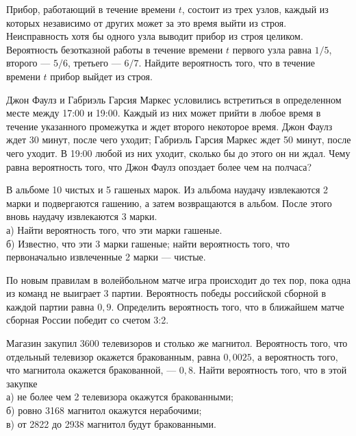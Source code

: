 \newpage\setcounter{zad}{0}



\begin{zkrW}{20}\noindent 
	Прибор, работающий в течение времени $t$, состоит из трех узлов, каждый из которых независимо от других может за это время выйти из строя. Неисправность хотя бы одного узла выводит прибор из строя целиком. Вероятность безотказной работы в течение времени $t$ первого узла равна $1/5$, второго --- $5/6$, третьего --- $6/7$. Найдите вероятность того, что в течение времени $t$ прибор выйдет из строя.
 
\end{zkrW}

\begin{zkrW}{20}\noindent 
	Джон Фаулз и Габриэль Гарсия Маркес условились встретиться в определенном месте между 17:00 и 19:00. Каждый из них может прийти в любое время в течение указанного промежутка и ждет второго некоторое время. Джон Фаулз ждет 30 минут, после чего уходит; Габриэль Гарсия Маркес ждет 50 минут, после чего уходит. В 19:00 любой из них уходит, сколько бы до этого он ни ждал. Чему равна вероятность того, что Джон Фаулз опоздает более чем на полчаса?
 
\end{zkrW}

\begin{zkrW}{20}\noindent 
	В альбоме 10 чистых и 5 гашеных марок. Из альбома наудачу извлекаются 2 марки и подвергаются гашению, а затем возвращаются в альбом. После этого вновь наудачу извлекаются 3 марки. \\ \indent а) Найти вероятность того, что эти марки гашеные. \\ \indent б) Известно, что эти 3 марки гашеные; найти вероятность того, что первоначально извлеченные 2 марки --- чистые.
 
\end{zkrW}

\begin{zkrW}{20}\noindent 
	По новым правилам в волейбольном матче игра происходит до тех пор, пока одна из команд не выиграет 3 партии. Вероятность победы российской сборной в каждой партии равна $0{,}9$. Определить вероятность того, что в ближайшем матче сборная России победит со счетом 3:2.
 
\end{zkrW}

\begin{zkrW}{20}\noindent 
	Магазин закупил 3600 телевизоров и столько же магнитол. Вероятность того, что отдельный телевизор окажется бракованным, равна $0{,}0025$, а вероятность того, что магнитола окажется бракованной, --- $0{,}8$. Найти вероятность того, что в этой закупке \\ \indent а) не более чем 2 телевизора окажутся бракованными; \\ \indent б) ровно 3168 магнитол окажутся нерабочими; \\ \indent в) от 2822 до 2938 магнитол будут бракованными.
 
\end{zkrW}

